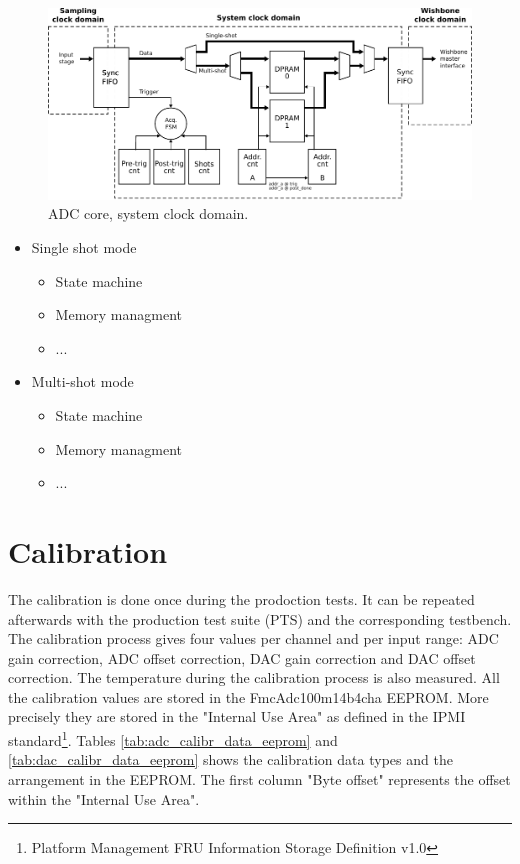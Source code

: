 \documentclass[11pt,a4paper]{article}
\begin{document}
\begin{figure}[h!]
  \includegraphics[width=\textwidth]{figures/adc_core_sys_clk.pdf}
  \caption{ADC core, system clock domain.}
  \label{fig:adc_core_sys_clk}
\end{figure}

\begin{itemize}

\item Single shot mode
  \begin{itemize}
  \item State machine
  \item Memory managment
  \item ...
  \end{itemize}

\item Multi-shot mode
  \begin{itemize}
  \item State machine
  \item Memory managment
  \item ...
  \end{itemize}
\end{itemize}




\section{Calibration}

The calibration is done once during the prodoction tests.
It can be repeated afterwards with the production test suite (PTS) and the corresponding testbench.
The calibration process gives four values per channel and per input range:
ADC gain correction, ADC offset correction, DAC gain correction and DAC offset correction.
The temperature during the calibration process is also measured.
All the calibration values are stored in the FmcAdc100m14b4cha EEPROM.
More precisely they are stored in the "Internal Use Area" as defined in the IPMI standard\footnote{Platform Management FRU Information Storage Definition v1.0}.
Tables \ref{tab:adc_calibr_data_eeprom} and \ref{tab:dac_calibr_data_eeprom} shows the calibration data types and the arrangement in the EEPROM.
The first column "Byte offset" represents the offset within the "Internal Use Area".
\end{document}
